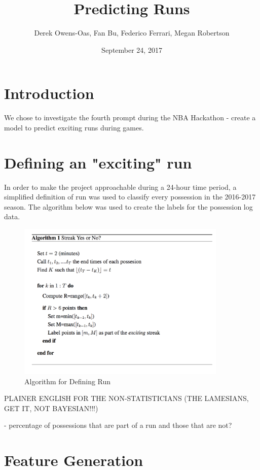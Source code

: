 \documentclass{article}
\title{Predicting Runs}
\author{Derek Owens-Oas, Fan Bu, Federico Ferrari, Megan Robertson}
\date{September 24, 2017}
\begin{document}
\maketitle

\section{Introduction}

We chose to investigate the fourth prompt during the NBA Hackathon - create a model to predict exciting runs during games. 

\section{Defining an "exciting" run}

In order to make the project approachable during a 24-hour time period, a simplified definition of run was used to classify every possession in the 2016-2017 season. The algorithm below was used to create the labels for the possession log data. 

\begin{figure}[h]
\begin{center}
\includegraphics[width=100mm]{run_alg.png}
\caption{Algorithm for Defining Run}
\end{center}
\end{figure}

PLAINER ENGLISH FOR THE NON-STATISTICIANS (THE LAMESIANS, GET IT, NOT BAYESIAN!!!)

- percentage of possessions that are part of a run and those that are not?

\section{Feature Generation}
\end{document}
